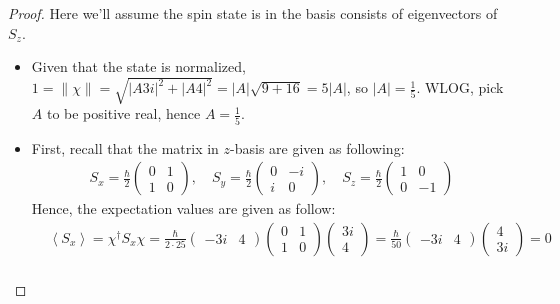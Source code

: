 \documentclass{article}
\begin{document}
\begin{proof}

    Here we'll assume the spin state is in the basis consists of eigenvectors of $S_z$.

    \hfil

    \begin{itemize}
        \item[(a)] Given that the state is normalized, $1=\|\chi\| = \sqrt{|A3i|^2+|A4|^2} = |A|\sqrt{9+16} = 5|A|$, so $|A| = \frac{1}{5}$. WLOG, pick $A$ to be positive real, hence $A=\frac{1}{5}$.
        
        \hfil

        \item[(b)] First, recall that the matrix in $z$-basis are given as following:
        \begin{align}
            S_x = \frac{\hbar}{2}\begin{pmatrix}
                0&1\\1&0
            \end{pmatrix},\quad S_y=\frac{\hbar}{2}\begin{pmatrix}
                0&-i\\i&0
            \end{pmatrix},\quad S_z = \frac{\hbar}{2}\begin{pmatrix}
                1&0\\0&-1
            \end{pmatrix}
        \end{align}
        Hence, the expectation values are given as follow:
        \begin{align}
            &\left<S_x\right> = \chi^\dagger S_x \chi = \frac{\hbar}{2\cdot 25}\begin{pmatrix}
                -3i&4
            \end{pmatrix}\begin{pmatrix}
                0&1\\1&0
            \end{pmatrix}\begin{pmatrix}
                3i\\4
            \end{pmatrix} = \frac{\hbar}{50}\begin{pmatrix}
                -3i&4
            \end{pmatrix}\begin{pmatrix}
                4\\3i
            \end{pmatrix} = 0\\

\end{align}
\end{itemize}
\end{proof}
\end{document}
